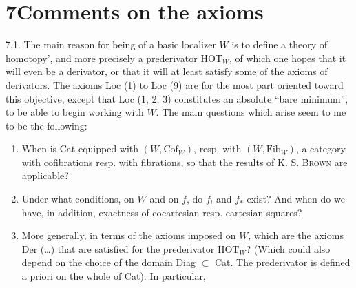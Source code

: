 
\section*{7\quad Comments on the axioms}

7.1. The main reason for being of a basic localizer $W$ is to define a theory of homotopy’, and more precisely a prederivator $\mathrm{HOT}_W$, of which one hopes that it will even be a derivator, or that it will at least satisfy some of the axioms of derivators. The axioms Loc (1) to Loc (9) are for the most part oriented toward this objective, except that Loc (1, 2, 3) constitutes an absolute ``bare minimum'', to be able to begin working with $W$. The main questions which arise seem to me to be the following: %
\begin{enumerate}[label={}, leftmargin=2.5em]
\item[1)] When is Cat equipped with $(W, \mathrm{Cof}_W)$, resp. with $(W, \mathrm{Fib}_W)$, a category with cofibrations resp. with fibrations, so that the results of K. S. \textsc{Brown} are applicable?
\item[2)] Under what conditions, on $W$ and on $f$, do $f_!$ and $f_*$ exist? And when do we have, in addition, exactness of cocartesian resp. cartesian squares?

\item[3)] More generally, in terms of the axioms imposed on $W$, which are the axioms Der (\ldots) that are satisfied for the prederivator $\mathrm{HOT}_W$? (Which could also depend on the choice of the domain Diag $\subset$ Cat. The prederivator is defined a priori on the whole of Cat). In particular, %
\end{enumerate}